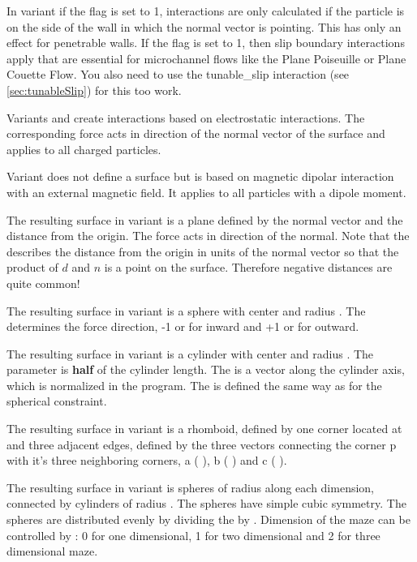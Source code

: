 In variant  if the  flag is set to
1, interactions are only calculated if the particle is on the side of
the wall in which the normal vector is pointing. This has only an
effect for penetrable walls. If the  flag is set
to 1, then slip boundary interactions apply that are essential for
microchannel flows like the Plane Poiseuille or Plane Couette
Flow. You also need to use the tunable_slip interaction (see
\ref{sec:tunableSlip}) for this too work.

Variants  and  create interactions based on electrostatic
interactions. The corresponding force acts in direction of the normal vector of the
surface and applies to all charged particles.

Variant  does not define a surface but is based on magnetic
dipolar interaction with an external magnetic field. It applies to all particles
with a dipole moment.

The resulting surface in variant  is a plane defined by the
normal vector    and the distance
 from the origin. The force acts in direction of the normal. 
Note that the  describes the distance from the origin in units
of the normal vector so that the product of $d$ and $n$ is a point on the
surface. Therefore negative distances are quite common!

The resulting surface in variant
 is a sphere with center    and radius
. The  determines the force direction, -1 or
 for inward and +1 or  for outward. 

The resulting surface
in variant  is a cylinder with center  
 and radius . The  parameter is \textbf{half} 
of the cylinder length. The  is a
vector along the cylinder axis, which is normalized in the program.
The  is defined the same way as for the spherical
constraint. 

The resulting surface in variant  is a rhomboid, defined by one 
corner located at    and three adjacent edges, 
defined by the three vectors connecting the corner p with it's three neighboring
corners, a (  ), b (  ) 
and c (  ).

The resulting surface in variant  is 
spheres of radius  along each dimension, connected by
cylinders of radius . The spheres have simple cubic
symmetry. The spheres are distributed evenly by dividing the
 by .  Dimension of the maze can be controlled by
: 0 for one dimensional, 1 for two dimensional and 2 for three
dimensional maze.

